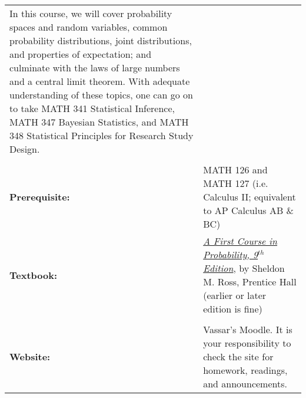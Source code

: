 \documentclass[11pt]{article}
\newcommand{\pl}[1]{\textcolor{Regalia}{\textbf{#1}}}
\begin{document}
\begin{center}
\begin{tabular}{ p{3.2cm} p{14cm} }
In this course, we will cover probability spaces and random variables, common probability distributions, joint distributions, and properties of expectation; and culminate with the laws of large numbers and a central limit theorem. With adequate understanding of these topics, one can go on to take MATH 341 Statistical Inference, MATH 347 Bayesian Statistics, and MATH 348 Statistical Principles for Research Study Design.\\
 					& \\
\pl{Prerequisite:}	& MATH 126 and MATH 127 (i.e. Calculus II; equivalent to AP Calculus AB \& BC)\\
\pl{Textbook:}	
& \href{http://www.amazon.com/First-Course-Probability-9th-Edition/dp/032179477X}{\textit{A First Course in Probability, 9$^{th}$ Edition}}, by Sheldon M. Ross, Prentice Hall (earlier or later edition is fine)\\
					& \\
\pl{Website:}	  & Vassar's Moodle. It is your responsibility to check the site for homework, readings, and announcements.\\


\end{tabular}
\end{center}
\end{document}
